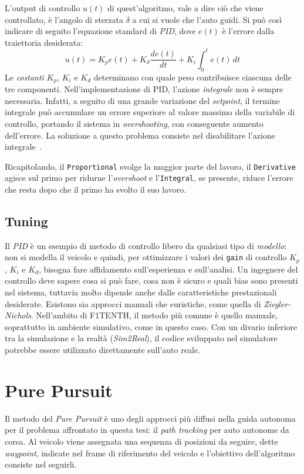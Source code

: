 L'output di controllo $u(t)$ di quest'algoritmo, vale a dire ciò che viene controllato, è 
l'angolo di sterzata $\delta$ a cui si vuole che l'auto guidi. 
Si può così indicare di seguito l'equazione standard di \textit{PID}, dove $e(t)$ è 
l'errore dalla traiettoria desiderata:
\[
u(t) = K_p e(t) + K_d \frac{de(t)}{dt} + K_i \int_{0}^{t} e(t) \,dt
\]
Le \textit{costanti} $K_p$, $K_i$ e $K_d$ determinano con quale peso contribuisce ciascuna delle tre componenti.
Nell'implementazione di PID, l'azione \textit{integrale} non è sempre necessaria.
Infatti, a seguito di una grande variazione del \textit{setpoint}, il termine integrale
può accumulare un errore superiore al valore massimo della variabile di controllo,
portando il sistema in \textit{overshooting}, con conseguente aumento dell'errore.
La soluzione a questo problema consiste nel disabilitare l'azione integrale~\cite{f1tenthcoursel04}.

Ricapitolando, il \verb|Proportional| svolge la maggior parte del lavoro, 
il \verb|Derivative| agisce sul primo per ridurne l'\textit{overshoot} e 
l'\verb|Integral|, se presente, riduce l'errore che resta dopo che il primo ha svolto il suo lavoro.

\subsection{Tuning}
Il \textit{PID} è un esempio di metodo di controllo libero da qualsiasi tipo di \textit{modello}: 
non si modella il veicolo e quindi, per ottimizzare i valori dei \verb|gain| di controllo 
$K_p$, $K_i$ e $K_d$, bisogna fare affidamento sull'esperienza e sull'analisi.
Un ingegnere del controllo deve sapere cosa si può fare, cosa non è sicuro e quali bias
sono presenti nel sistema, tuttavia molto dipende anche dalle caratteristiche prestazionali desiderate. 
Esistono sia approcci manuali che euristiche, come quella di \textit{Ziegler-Nichols}. Nell'ambito di F1TENTH, il metodo più comune è quello manuale, soprattutto in ambiente 
simulativo, come in questo caso. Con un divario inferiore tra la simulazione e la realtà 
(\textit{Sim2Real}), il codice sviluppato nel simulatore potrebbe essere utilizzato direttamente sull'auto reale.

\section{Pure Pursuit}
Il metodo del \textit{Pure Pursuit} è uno degli approcci più diffusi nella guida
autonoma per il problema affrontato in questa tesi: il \textit{path tracking} per
auto autonome da corsa.
Al veicolo viene assegnata una sequenza di posizioni da seguire, dette \textit{waypoint},
indicate nel frame di riferimento del veicolo e l'obiettivo dell'algoritmo consiste nel seguirli.


